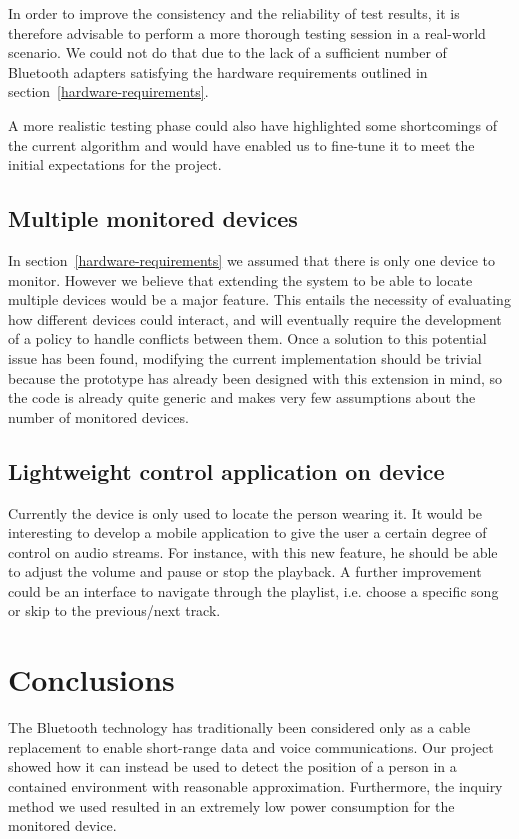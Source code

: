 \documentclass[conference]{IEEEtran}
\begin{document}
In order to improve the consistency and the reliability of test results, it is therefore advisable to perform a more thorough testing session in a real-world scenario. We could not do that due to the lack of a sufficient number of Bluetooth adapters satisfying the hardware requirements outlined in section~\ref{hardware-requirements}.

A more realistic testing phase could also have highlighted some shortcomings of the current algorithm and would have enabled us to fine-tune it to meet the initial expectations for the project.

\subsection{Multiple monitored devices}
In section~\ref{hardware-requirements} we assumed that there is only one device to monitor. However we believe that extending the system to be able to locate multiple devices would be a major feature. This entails the necessity of evaluating how different devices could interact, and will eventually require the development of a policy to handle conflicts between them. Once a solution to this potential issue has been found, modifying the current implementation should be trivial because the prototype has already been designed with this extension in mind, so the code is already quite generic and makes very few assumptions about the number of monitored devices.

\subsection{Lightweight control application on device}
Currently the device is only used to locate the person wearing it. It would be interesting to develop a mobile application to give the user a certain degree of control on audio streams. For instance, with this new feature, he should be able to adjust the volume and pause or stop the playback. A further improvement could be an interface to navigate through the playlist, i.e. choose a specific song or skip to the previous/next track.


\section{Conclusions}
The Bluetooth technology has traditionally been considered only as a cable replacement to enable short-range data and voice communications. Our project showed how it can instead be used to detect the position of a person in a contained environment with reasonable approximation. Furthermore, the inquiry method we used resulted in an extremely low power consumption for the monitored device.
\end{document}
